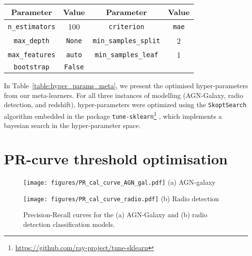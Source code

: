 \documentclass{aa}
\begin{document}
\begin{appendix}
\begin{table}
{\begin{tabular}{c c c c}
Parameter                           & Value             & Parameter                     & Value         \\
\hline
\texttt{n\_estimators}              & 100               & \texttt{criterion}            & \texttt{mae}  \\
\texttt{max\_depth}                 & \texttt{None}     & \texttt{min\_samples\_split}  & 2             \\
\texttt{max\_features}              & \texttt{auto}     & \texttt{min\_samples\_leaf}   & 1             \\
\texttt{bootstrap}                  & \texttt{False}    &                               &               \\
\hline
\end{tabular}
}
\end{table}

In Table~\ref{table:hyper_params_meta}, we present the optimised hyper-parameters from our meta-learners. For all three instances of modelling (AGN-Galaxy, radio detection, and redshift), hyper-parameters were optimized using the \verb|SkoptSearch| algorithm embedded in the package \verb|tune-sklearn|\footnote{\url{https://github.com/ray-project/tune-sklearn}} \citep[\texttt{v0.4.1};][]{head_tim_2021_5565057}, which implements a bayesian search in the hyper-parameter space.

\section{PR-curve threshold optimisation}\label{sec:app_pr_curve}

\begin{figure}
  \centering
  \begin{minipage}{0.24\textwidth}
    \centering
    \texttt{[image: figures/PR\_cal\_curve\_AGN\_gal.pdf]}\hfill\break
    {(a) AGN-galaxy} 
  \end{minipage}
  \hfill 
  \begin{minipage}{0.24\textwidth}
    \centering
    \texttt{[image: figures/PR\_cal\_curve\_radio.pdf]}\hfill\break
    {(b) Radio detection}
  \end{minipage}
  \centering
  \caption{Precision-Recall curves for the (a) AGN-Galaxy and (b) radio detection classification models.}
  \label{fig:PR_curves_classification}
\end{figure}


\end{appendix}
\end{document}
